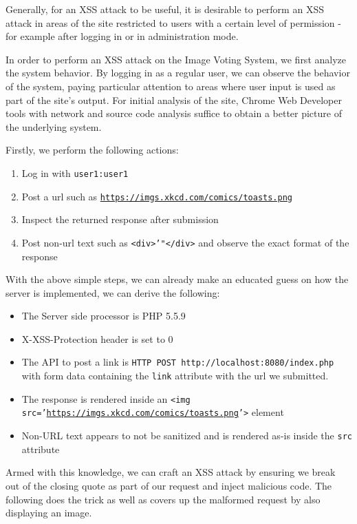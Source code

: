 \documentclass[a4paper, 12pt]{article}
\begin{document}
Generally, for an XSS attack to be useful, it is desirable to perform an XSS attack in areas of the site restricted to users with a certain level of permission - for example after logging in or in administration mode.

In order to perform an XSS attack on the Image Voting System, we first analyze the system behavior. By logging in as a regular user, we can observe the behavior of the system, paying particular attention to areas where user input is used as part of the site's output. For initial analysis of the site, Chrome Web Developer tools with network and source code analysis suffice to obtain a better picture of the underlying system.

Firstly, we perform the following actions:
\begin{enumerate}
	\item Log in with \texttt{user1:user1}
    \item Post a url such as \texttt{\url{https://imgs.xkcd.com/comics/toasts.png}}
    \item Inspect the returned response after submission
    \item Post non-url text such as \texttt{<div>'"</div>} and observe the exact format of the response
\end{enumerate}

With the above simple steps, we can already make an educated guess on how the server is implemented, we can derive the following:

\begin{itemize}
	\item The Server side processor is PHP 5.5.9
    \item X-XSS-Protection header is set to 0
    \item The API to post a link is \texttt{HTTP POST http://localhost:8080/index.php} with form data containing the \texttt{link} attribute with the url we submitted.
    \item The response is rendered inside an \texttt{<img src='\url{https://imgs.xkcd.com/comics/toasts.png}'>} element
    \item Non-URL text appears to not be sanitized and is rendered as-is inside the \texttt{src} attribute
\end{itemize}

Armed with this knowledge, we can craft an XSS attack by ensuring we break out of the closing quote as part of our request and inject malicious code. The following does the trick as well as covers up the malformed request by also displaying an image.
\end{document}
